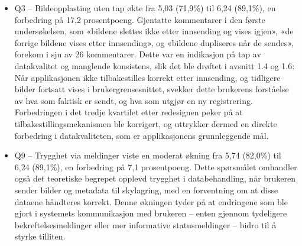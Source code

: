 \begin{itemize}
\item Q3 – Bildeopplasting uten tap økte fra 5,03 (71,9\%) til 6,24 (89,1\%), en forbedring på 17,2 prosentpoeng. Gjentatte kommentarer i den første undersøkelsen, som «bildene slettes ikke etter innsending og vises igjen», «de forrige bildene vises etter innsending», og «bildene dupliseres når de sendes», forekom i sju av 26 kommentarer. Dette var en indikasjon på tap av datakvalitet og manglende konsistens, slik det ble drøftet i avsnitt 1.4 og 1.6: Når applikasjonen ikke tilbakestilles korrekt etter innsending, og tidligere bilder fortsatt vises i brukergrensesnittet, svekker dette brukerens forståelse av hva som faktisk er sendt, og hva som utgjør en ny registrering. Forbedringen i det tredje kvartilet etter redesignen peker på at tilbakestillingsmekanismen ble korrigert, og uttrykker dermed en direkte forbedring i datakvaliteten, som er applikasjonens grunnleggende mål.
\item Q9 – Trygghet via meldinger viste en moderat økning fra 5,74 (82,0\%) til 6,24 (89,1\%), en forbedring på 7,1 prosentpoeng. Dette spørsmålet omhandler også det teoretiske begrepet opplevd trygghet i databehandling, når brukeren sender bilder og metadata til skylagring, med en forventning om at disse dataene håndteres korrekt. Denne økningen tyder på at endringene som ble gjort i systemets kommunikasjon med brukeren – enten gjennom tydeligere bekreftelsesmeldinger eller mer informative statusmeldinger – bidro til å styrke tilliten.
\end{itemize}

